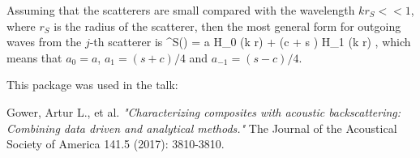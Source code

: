 \documentclass[ 12pt, a4paper]{article}
\def\bga#1\ega{\begin{gather}#1\end{gather}} %
\renewcommand{\vec}[1]{\boldsymbol{#1}}
\begin{document}
Assuming that the scatterers are small compared with the wavelength $k r_S << 1$, where $r_S$ is the radius of the scatterer, then the most general form for outgoing waves from the $j$-th scatterer is
\bga
\psi^{S}(\vec r) = a H_0 (k r) + (c \cos \theta + s \sin \theta ) H_1 (k r) ,
\ega
which means that $a_0 = a$, $a_1 = (s + c)/4$ and  $a_{-1} = (s-c)/4$.


This package was used in the talk:


Gower, Artur L., et al. \emph{"Characterizing composites with acoustic backscattering: Combining data driven and analytical methods."} The Journal of the Acoustical Society of America 141.5 (2017): 3810-3810.
\end{document}
